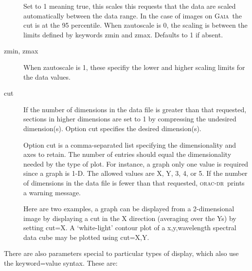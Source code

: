 \documentclass[twoside,11pt]{article}
\newcommand{\xref}[3]{#1}
\renewcommand{\_}{\texttt{\symbol{95}}}
\newcommand{\oracdr}{\textsc{orac-dr}}
\newcommand{\gaia}{\xref{{\textsc{Gaia}}}{sun214}{}}
\begin{document}
\begin{description}
Set to 1 meaning true, this scales this requests that the data are
scaled automatically between the data range.  In the case of images on
\gaia\ the cut is at the 95 percentile.  When zautoscale is 0, the
scaling is between the limits defined by keywords zmin and zmax.
Defaults to 1 if absent.

\item[zmin, zmax] \mbox{}

When zautoscale is 1, these specifiy the lower and higher 
scaling limits for the data values.

\item[cut] \mbox{}

If the number of dimensions in the data file is greater than that
requested, sections in higher dimensions are set to 1 by compressing
the undesired dimension(s).  Option cut specifies the desired
dimension(s).



Option cut is a comma-separated list specifying the dimensionality and
axes to retain.  The number of entries should equal the dimensionality
needed by the type of plot.  For instance, a graph only one value is
required since a graph is 1-D.  The allowed values are X, Y, 3, 4, or
5. If the number of dimensions in the data file is fewer than that
requested, \oracdr\ prints a warning message.



Here are two examples, a graph can be displayed from a 2-dimensional
image by displaying a cut in the X direction (averaging over the Ys)
by setting cut=X.   A `white-light' contour plot of a x,y,wavelength
spectral data cube may be plotted using cut=X,Y.

\end{description}


There are also parameters special to particular types of display,
which also use the keyword=value syntax.  These are:
\end{document}
